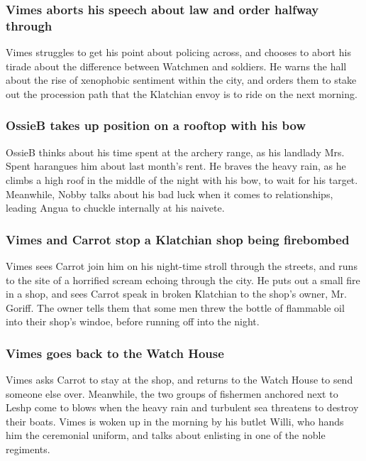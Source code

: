 \subsubsection{\Gls{Vimes} aborts his speech about law and order halfway through}
\Gls{Vimes} struggles to get his point about policing across, and chooses to abort his tirade about
the difference between Watchmen and soldiers. He warns the hall about the rise of xenophobic
sentiment within the city, and orders them to stake out the procession path that the Klatchian
envoy is to ride on the next morning.

\subsubsection{\Gls{OssieB} takes up position on a rooftop with his bow}
\Gls{OssieB} thinks about his time spent at the archery range, as his landlady Mrs. \Gls{Spent}
harangues him about last month's rent. He braves the heavy rain, as he climbs a high roof in the
middle of the night with his bow, to wait for his target. Meanwhile, \Gls{Nobby} talks about his
bad luck when it comes to relationships, leading \Gls{Angua} to chuckle internally at his naivete.

\subsubsection{\Gls{Vimes} and \Gls{Carrot} stop a Klatchian shop being firebombed}
\Gls{Vimes} sees \Gls{Carrot} join him on his night-time stroll through the streets, and runs to the
site of a horrified scream echoing through the city. He puts out a small fire in a shop, and
sees \Gls{Carrot} speak in broken Klatchian to the shop's owner, Mr. \Gls{Goriff}. The owner tells
them that some men threw the bottle of flammable oil into their shop's windoe, before running off
into the night.

\subsubsection{\Gls{Vimes} goes back to the Watch House}
\Gls{Vimes} asks \Gls{Carrot} to stay at the shop, and returns to the Watch House to send someone
else over. Meanwhile, the two groups of fishermen anchored next to Leshp come to blows when the
heavy rain and turbulent sea threatens to destroy their boats. \Gls{Vimes} is woken up in the
morning by his butlet \Gls{Willi}, who hands him the ceremonial uniform, and talks about enlisting
in one of the noble regiments.

